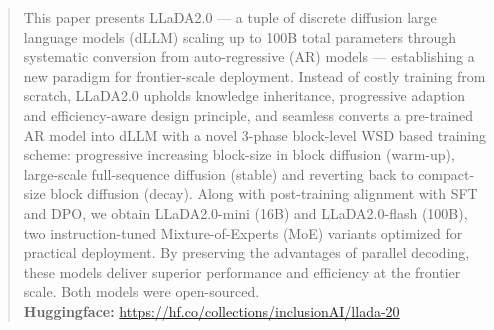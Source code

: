 \begin{abstract}

This paper presents LLaDA2.0 --- a tuple of discrete diffusion large language models (dLLM) scaling up to 100B total parameters through systematic conversion from auto-regressive (AR) models --- establishing a new paradigm for frontier-scale deployment. 
Instead of costly training from scratch, 
LLaDA2.0 upholds knowledge inheritance, progressive adaption and efficiency-aware design principle, and seamless converts a pre-trained AR model into dLLM with a novel 3-phase block-level WSD based training scheme: progressive increasing block-size in block diffusion (warm-up), large-scale full-sequence diffusion (stable) and reverting back to compact-size block diffusion (decay).
Along with post-training alignment with SFT and DPO, we obtain LLaDA2.0-mini (16B) and LLaDA2.0-flash (100B), two instruction-tuned Mixture-of-Experts (MoE) variants optimized for practical deployment. By preserving the advantages of parallel decoding, these models deliver superior performance and efficiency at the frontier scale.
Both models were open-sourced.\\

\textbf{Huggingface:} \url{https://hf.co/collections/inclusionAI/llada-20}






\end{abstract}
